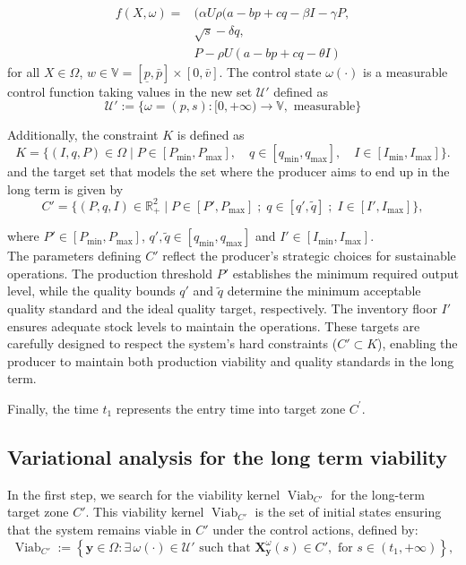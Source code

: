 \documentclass[]{interact}
\theoremstyle{plain}%
\theoremstyle{definition}
\theoremstyle{remark}
\begin{document}
\begin{equation*}
	\begin{aligned}
		f(X,\omega) = & ( \alpha U \rho(a-b p+c q - \beta I- \gamma P, \\
		& \sqrt{s} - \delta q, \\
		& P - \rho U (a-b p+c q -\theta I )
	\end{aligned}
\end{equation*}
for all $X\in \Omega$, $w\in \mathbb{V}= [\underline{p}, \bar{p}]\times [0, \bar{v}]$. The control state $\omega(\cdot)$ is a measurable control function taking values in the new set $\mathcal{U'}$ defined as
$$
\mathcal{U'}:=\{\omega=(p, s ):[0,+\infty) \rightarrow \mathbb{V}, \text { measurable}\}
$$

Additionally, the constraint $K$ is defined as
\[
K = \{ (I,q,P) \in \Omega \mid P \in [P_{\text{min}}, P_{\text{max}}], \quad q \in [q_{\text{min}}, q_{\text{max}}], \quad I \in [I_{\text{min}}, I_{\text{max}}]\}.
\]
and the target set that models the set where the producer aims to end up in the long term  is given by
$$C'=\{ (P, q, I) \in \mathbb{R}^2_+ \mid P \in [P', P_{\text{max}}]\; ; \;    q \in [q',\tilde{q}] \; ; \;I \in [I', I_{\text{max}}] \}, $$

where $P' \in [P_{\text{min}}, P_{\text{max}}]$, $q', \tilde{q}\in [q_{\text{min}}, q_{\text{max}}]$ and $I'\in [I_{\text{min}}, I_{\text{max}}].$\\
The parameters defining $C'$ reflect the producer's strategic choices for sustainable operations. The production threshold $P'$ establishes the minimum required output level, while the quality bounds $q'$ and $\tilde{q}$ determine the minimum acceptable quality standard and the ideal quality target, respectively. The inventory floor $I'$ ensures adequate stock levels to maintain the operations. These targets are carefully designed to respect the system's hard constraints ($C' \subset K$), enabling the producer to maintain both production viability and quality standards in the long term.

Finally, the time $t_{1} $ represents the entry time into target zone $C^{'}$.

\subsection{Variational analysis for the long term viability}\label{long_viab}

In the first step, we search for the viability kernel \(\operatorname{Viab}_{C'}\) for the long-term target zone \(C'\). This viability kernel \(\operatorname{Viab}_{C'}\) is  the set of initial states ensuring that the system remains viable in \(C'\) under the control actions, defined by:
\[
\operatorname{Viab}_{C'} := \left\{ \mathbf{y}  \in \Omega : \exists\, \omega(\cdot) \in \mathcal{U'} \text{ such that } \mathbf{X}_{\mathbf{y}}^\omega(s) \in C', \text{ for } s \in (t_{1}, +\infty) \right\},
\]
\end{document}
